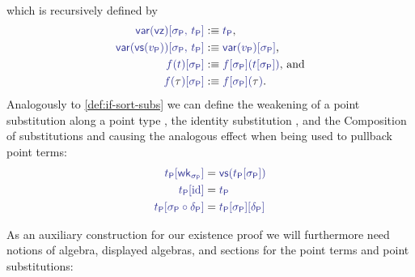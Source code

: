 \begin{defn}
\begin{equation*}
\begin{gathered}
\end{gathered}
\end{equation*}
which is recursively defined by
\begin{align*}
\tqm{\var(\vz)[\sigma_\Pc,\, t_\Pc]}
  &:\equiv \tqm{t_\Pc} \text{,} \\
\tqm{\var(\vs(v_\Pc))[\sigma_\Pc,\, t_\Pc]}
  &:\equiv \tqm{\var(v_\Pc)[\sigma_\Pc]} \text{,} \\
\tqm{f(t)[\sigma_\Pc]}
  &:\equiv \tqm{f[\sigma_\Pc](t[\sigma_\Pc]) } \text{, and} \\
\tqm{f(\bltau)[\sigma_\Pc]}
  &:\equiv \tqm{f[\sigma_\Pc](\bltau)} \text{.}
\end{align*}
Analogously to \ref{def:if-sort-subs} we can define the weakening
 of a point substitution
\tqm{\IFSub{\sigma_\Pc}{\Gamma}{\Delta}} along a point type ,
the identity substitution \tqm{\IFSub{\id_\Pc}{\Gamma}{\Gamma}}, and
the Composition \tqm{\IFSub{\sigma_\Pc \circ \delta_\Pc}{\Gamma}{\Sigma}} of substitutions
\tqm{\IFSub{\sigma_\Pc}{\Delta}{\Sigma}} and \tqm{\IFSub{\delta_\Pc}{\Gamma}{\Delta}}
causing the analogous effect when being used to pullback point terms:
\begin{align*}
\tqm{t_\Pc[\wk_{\sigma_\Pc}]}
  &= \tqm{\vs(t_\Pc[\sigma_\Pc])} \\
\tqm{t_\Pc[\id]}
  &= \tqm{t_\Pc} \\
\tqm{t_\Pc[\sigma_\Pc \circ \delta_\Pc]}
  &= \tqm{t_\Pc[\sigma_\Pc][\delta_\Pc]}
\end{align*}
\end{defn}

As an auxiliary construction for our existence proof we will furthermore need
notions of algebra, displayed algebras, and sections for the point terms and
point substitutions:

